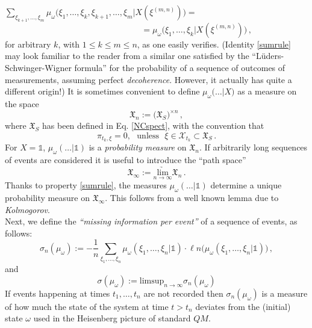 \documentclass[12pt]{article}
\begin{document}
\quad $\underset{\xi_{k+1},\dots, \xi_{m}}{\sum} \mu_{\omega} \big(\xi_1,\dots, \xi_{k}, \xi_{k+1}, \dots, \xi_{m}\vert X({\xi}^{(m,n)})\big) = $
\begin{equation}\label{sumrule}
\hspace{4cm} = \mu_{\omega}(\xi_1, \dots, \xi_{k} \vert X({\xi}^{(m,n)})\big)\,,
\end{equation}
for arbitrary $k$, with $1\leq k \leq m\leq n$, as one easily verifies. (Identity \eqref{sumrule} may look familiar to the reader from a similar one satisfied by the ``L\"{u}ders-Schwinger-Wigner formula'' \cite{Schwinger} for the probability of a sequence of outcomes of measurements, assuming perfect \textit{decoherence}. However, it actually has quite a different origin!) It is sometimes convenient to define $\mu_{\omega}\big(\dots \vert X\big)$ as a measure on the space
$$\mathfrak{X}_{n}:= \big(\mathfrak{X}_{S}\big)^{\times n}\,,$$
where $\mathfrak{X}_{S}$ has been defined in Eq. \eqref{NCspect}, with the convention that 
$$\pi_{t_{k}, \xi}=0, \,\,\text{  unless  }\,\, \xi \in \mathcal{X}_{t_k} \subset \mathfrak{X}_{S}\,.$$
For $X ={\mathds{1}}$, $\mu_{\omega}(\dots\vert {\mathds{1}})$ is a \textit{probability measure} on $\mathfrak{X}_{n}$. If arbitrarily long sequences of events are considered it is useful to introduce the ``path space''
$$\mathfrak{X}_{\infty}:=\underset{n \rightarrow \infty}{\underrightarrow{\text{lim}}} \mathfrak{X}_{n}\,.$$
Thanks to property \eqref{sumrule}, the measures $\mu_{\omega}(\dots \vert {\mathds{1}})$ determine a unique probability measure on $\mathfrak{X}_{\infty}$. This follows from a well known lemma due to \textit{Kolmogorov}.\\
Next, we define the \textit{``missing information per event''} of a sequence of events, as follows:
$$\sigma_{n}(\mu_{\omega}):= - \frac{1}{n}\sum_{\xi_1, \dots, \xi_n} \mu_{\omega}(\xi_1, \dots, \xi_n\vert {\mathds{1}}) 
\cdot \ell n\big(\mu_{\omega}(\xi_1, \dots, \xi_n \vert {\mathds{1}})\big)\,, $$
and 
\begin{equation}\label{spec-entropy}
\sigma(\mu_{\omega}):= \text{limsup}_{n\rightarrow \infty} \sigma_{n}(\mu_{\omega})
\end{equation}
If events happening at times $t_1,\dots, t_n$ are not recorded then $\sigma_{n}(\mu_{\omega})$ is a measure of how much the state of the system at time $t>t_n$ deviates from the (initial) state $\omega$ used in the Heisenberg picture of standard $QM$.
\end{document}
